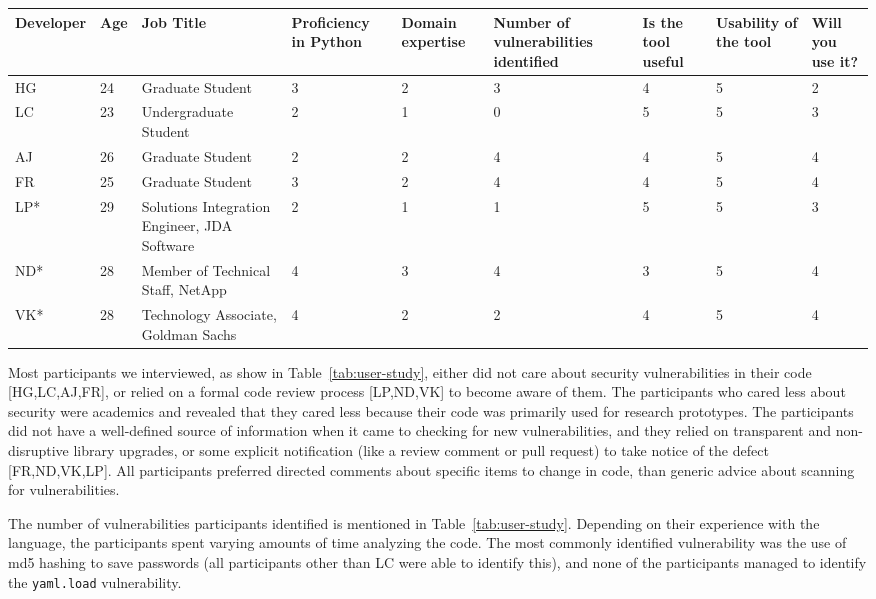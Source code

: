 \begin{table*}[!h]
\small
  \centering
  \begin{tabular}{|p{}|p{}|p{}|p{}|p{}|p{}|p{}|p{}|p{}|}
    \hline
Developer & Age & Job Title & Proficiency in Python & Domain expertise & Number of vulnerabilities identified & Is the tool useful & Usability of the tool & Will you use it? \\
\hline
\hline
HG & 24 & Graduate Student & 3 & 2 & 3 & 4 & 5 & 2 \\
\hline
LC & 23 & Undergraduate Student & 2 & 1 & 0 & 5 & 5 & 3 \\
\hline
AJ & 26 & Graduate Student & 2 & 2 & 4 & 4 & 5 & 4 \\
\hline
FR & 25 & Graduate Student & 3 & 2 & 4 & 4 & 5 & 4 \\
\hline
LP* & 29 & Solutions Integration Engineer, JDA Software & 2 & 1 & 1 & 5 & 5 & 3 \\
\hline
ND* & 28 & Member of Technical Staff, NetApp & 4 & 3 & 4 & 3 & 5 & 4 \\
\hline
VK* & 28 & Technology Associate, Goldman Sachs & 4 & 2 & 2 & 4 & 5 & 4 \\
\hline
  \end{tabular}
  \caption{User demographics data. Participants marked with an asterix(*) were interviewed remotely over Skype. The ratings are on a scale of 1 to 5, where 1 is the worst and 5 is the best possible score for that question} 
  \label{tab:user-study}
\end{table*}


Most participants we interviewed, as show in Table~\ref{tab:user-study}, either did not care about security vulnerabilities in their code [HG,LC,AJ,FR], or relied on a formal code review process [LP,ND,VK] to become aware of them. The participants who cared less about security were academics and revealed that they cared less because their code was primarily used for research prototypes. The participants did not have a well-defined source of information when it came to checking for new vulnerabilities, and they relied on transparent and non-disruptive library upgrades, or some explicit notification (like a review comment or pull request) to take notice of the defect [FR,ND,VK,LP].  All participants preferred directed comments about specific items to change in code, than generic advice about scanning for vulnerabilities. 

The number of vulnerabilities participants identified is mentioned in Table~\ref{tab:user-study}. Depending on their experience with the language, the participants spent varying amounts of time analyzing the code. The most commonly identified vulnerability was the use of md5 hashing to save passwords (all participants other than LC were able to identify this), and none of the participants managed to identify the \texttt{yaml.load} vulnerability. 

